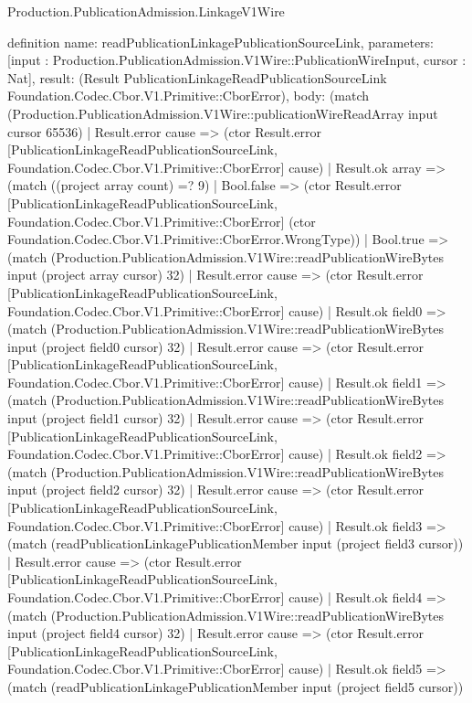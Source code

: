 \begin{lexlean}{Production.PublicationAdmission.LinkageV1Wire}
\begin{semanticmodule}
definition{
  name: readPublicationLinkagePublicationSourceLink,
  parameters: [input : Production.PublicationAdmission.V1Wire::PublicationWireInput, cursor : Nat],
  result: (Result PublicationLinkageReadPublicationSourceLink Foundation.Codec.Cbor.V1.Primitive::CborError),
  body: (match (Production.PublicationAdmission.V1Wire::publicationWireReadArray input cursor 65536)
    | Result.error cause => (ctor Result.error [PublicationLinkageReadPublicationSourceLink, Foundation.Codec.Cbor.V1.Primitive::CborError] cause)
    | Result.ok array => (match ((project array count) =? 9)
      | Bool.false => (ctor Result.error [PublicationLinkageReadPublicationSourceLink, Foundation.Codec.Cbor.V1.Primitive::CborError] (ctor Foundation.Codec.Cbor.V1.Primitive::CborError.WrongType))
      | Bool.true => (match (Production.PublicationAdmission.V1Wire::readPublicationWireBytes input (project array cursor) 32)
        | Result.error cause => (ctor Result.error [PublicationLinkageReadPublicationSourceLink, Foundation.Codec.Cbor.V1.Primitive::CborError] cause)
        | Result.ok field0 => (match (Production.PublicationAdmission.V1Wire::readPublicationWireBytes input (project field0 cursor) 32)
          | Result.error cause => (ctor Result.error [PublicationLinkageReadPublicationSourceLink, Foundation.Codec.Cbor.V1.Primitive::CborError] cause)
          | Result.ok field1 => (match (Production.PublicationAdmission.V1Wire::readPublicationWireBytes input (project field1 cursor) 32)
            | Result.error cause => (ctor Result.error [PublicationLinkageReadPublicationSourceLink, Foundation.Codec.Cbor.V1.Primitive::CborError] cause)
            | Result.ok field2 => (match (Production.PublicationAdmission.V1Wire::readPublicationWireBytes input (project field2 cursor) 32)
              | Result.error cause => (ctor Result.error [PublicationLinkageReadPublicationSourceLink, Foundation.Codec.Cbor.V1.Primitive::CborError] cause)
              | Result.ok field3 => (match (readPublicationLinkagePublicationMember input (project field3 cursor))
                | Result.error cause => (ctor Result.error [PublicationLinkageReadPublicationSourceLink, Foundation.Codec.Cbor.V1.Primitive::CborError] cause)
                | Result.ok field4 => (match (Production.PublicationAdmission.V1Wire::readPublicationWireBytes input (project field4 cursor) 32)
                  | Result.error cause => (ctor Result.error [PublicationLinkageReadPublicationSourceLink, Foundation.Codec.Cbor.V1.Primitive::CborError] cause)
                  | Result.ok field5 => (match (readPublicationLinkagePublicationMember input (project field5 cursor))
}
\end{semanticmodule}
\end{lexlean}
